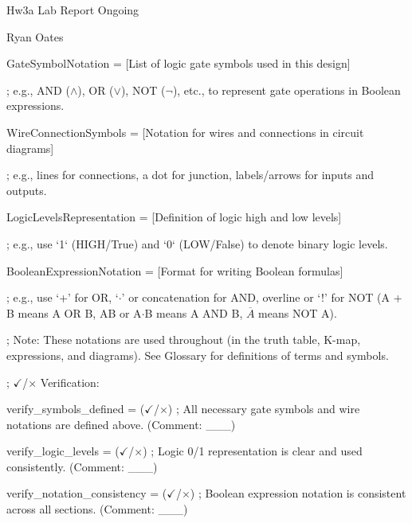 \documentclass[11pt]{article}
\begin{document}
\noindent Hw3a Lab Report Ongoing

\noindent Ryan Oates


\noindent GateSymbolNotation = [List of logic gate symbols used in this design]

\noindent ; e.g., AND ($\land$), OR ($\lor$), NOT ($\lnot$), etc., to represent gate operations in Boolean expressions.

\vspace{0.5em}

\noindent WireConnectionSymbols = [Notation for wires and connections in circuit diagrams]

\noindent ; e.g., lines for connections, a dot for junction, labels/arrows for inputs and outputs.

\vspace{0.5em}

\noindent LogicLevelsRepresentation = [Definition of logic high and low levels]

\noindent ; e.g., use `1` (HIGH/True) and `0` (LOW/False) to denote binary logic levels.

\vspace{0.5em}

\noindent BooleanExpressionNotation = [Format for writing Boolean formulas]

\noindent ; e.g., use `+' for OR, `$\cdot$' or concatenation for AND, overline or `!' for NOT (A + B means A OR B, AB or A$\cdot$B means A AND B, $\overline{A}$ means NOT A).

\noindent ; Note: These notations are used throughout (in the truth table, K-map, expressions, and diagrams). See Glossary for definitions of terms and symbols.

\vspace{0.5em}

\noindent ; $\checkmark$/$\times$ Verification:

\noindent verify\_symbols\_defined = ($\checkmark$/$\times$) ; All necessary gate symbols and wire notations are defined above. (Comment: \_\_\_)

\noindent verify\_logic\_levels = ($\checkmark$/$\times$) ; Logic 0/1 representation is clear and used consistently. (Comment: \_\_\_)

\noindent verify\_notation\_consistency = ($\checkmark$/$\times$) ; Boolean expression notation is consistent across all sections. (Comment: \_\_\_)

\vspace{0.5em}
\end{document}
